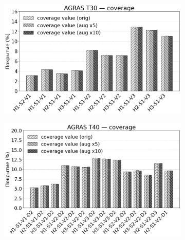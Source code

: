 \begin{figure}[htbp]
	\begin{minipage}{0.95\linewidth}
	\begin{subfigure}[t]{\dimexpr.5\linewidth-1.3em\relax}
		\centering
		\includegraphics[width=.95\linewidth,valign=t]{my_folder/images/augment/spraying_performance/T30-coverage.png}
	\end{subfigure}
	\hfill %
		\begin{subfigure}[t]{\dimexpr.5\linewidth-1.3em\relax}
			\centering
			\includegraphics[width=.95\linewidth,valign=t]{my_folder/images/augment/spraying_performance/T40-coverage.png}
		\end{subfigure}
	\\[20pt]
	\begin{subfigure}[t]{\dimexpr.5\linewidth-1.3em\relax}

\end{subfigure}
\end{minipage}
\end{figure}
